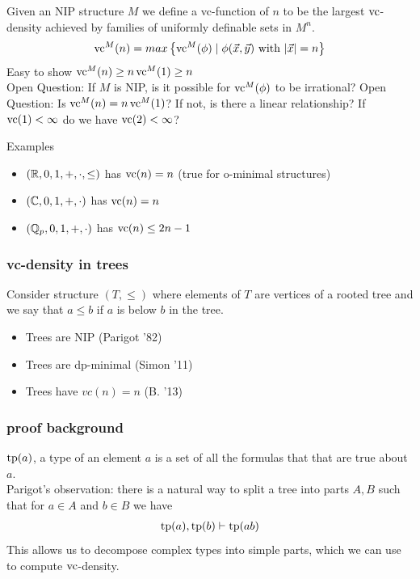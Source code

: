 \documentclass{beamer}
\newcommand{\curly}[1]{\left\{ #1 \right\}}
\begin{document}
\begin{frame}
	Given an NIP structure $M$ we define a vc-function of $n$ to be the largest $\operatorname{vc}$-density achieved by families of uniformly definable sets in $M^n$.
	\begin{align*}
		\vc^M(n) = max \curly{ \vc^M(\phi) \mid \phi(\vec x, \vec y) \text{ with } |\vec x| = n}
	\end{align*}
	Easy to show $\operatorname{vc}^M(n) \geq n \operatorname{vc}^M(1) \geq n$ \\

	Open Question: If $M$ is NIP, is it possible for $\operatorname{vc}^M(\phi)$ to be irrational?
	Open Question: Is $\operatorname{vc}^M(n) = n \operatorname{vc}^M(1)$? If not, is there a linear relationship? If $\operatorname{vc}(1) < \infty$ do we have $\operatorname{vc}(2) < \infty$?
\end{frame}

\begin{frame}
	Examples
	\begin{itemize}
		\item $(\mathbb{R}, 0, 1, +, \cdot, \leq)$ has $\operatorname{vc}(n) = n$ (true for o-minimal structures)
		\item $(\mathbb{C}, 0, 1, +, \cdot)$ has $\operatorname{vc}(n) = n$
		\item $(\mathbb{Q}_p, 0, 1, +, \cdot)$ has $\operatorname{vc}(n) \leq 2n - 1$
	\end{itemize}
\end{frame}

\begin{frame}
	\frametitle{vc-density in trees}
	Consider structure $(T, \leq)$ where elements of $T$ are vertices of a rooted tree and we say that $a \leq b$ if $a$ is below $b$ in the tree.
	\begin{itemize}
		\item Trees are NIP (Parigot '82)
		\item Trees are dp-minimal (Simon '11)
		\item Trees have $vc(n) = n$ (B. '13)
	\end{itemize}
\end{frame}

\begin{frame}
	\frametitle{proof background}
	$\operatorname{tp}(a)$, a type of an element $a$ is a set of all the formulas that that are true about $a$.\\
	Parigot's observation: there is a natural way to split a tree into parts $A, B$ such that for $a \in A$ and $b \in B$ we have
	\begin{align*}
		\operatorname{tp}(a), \operatorname{tp}(b) \vdash \operatorname{tp}(ab)
	\end{align*}
	This allows us to decompose complex types into simple parts, which we can use to compute $\operatorname{vc}$-density.
\end{frame}
\end{document}
